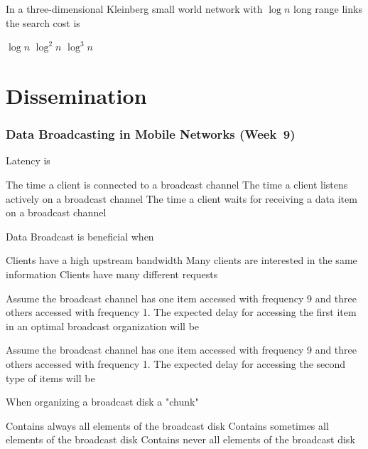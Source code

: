 \documentclass[12pt,a4paper,answers]{exam} %
\begin{document}
\begin{flushleft}
\begin{multicols*}{2}
\begin{questions}
\question In a three-dimensional Kleinberg small world network with $\log n$ long range links the search cost is
\begin{checkboxes}
\CorrectChoice $\log n$
\choice $\log^2 n$
\choice $\log^3 n$
\end{checkboxes}

\part{Dissemination}
\section{Data Broadcasting in Mobile Networks (Week~9)}

\question Latency is
\begin{checkboxes}
\choice The time a client is connected to a broadcast channel
\choice The time a client listens actively on a broadcast channel
\CorrectChoice The time a client waits for receiving a data item on a broadcast channel 
\end{checkboxes}

\question Data Broadcast is beneficial when
\begin{checkboxes}
\choice Clients have a high upstream bandwidth
\CorrectChoice Many clients are interested in the same information
\choice Clients have many different requests
\end{checkboxes}

\question Assume the broadcast channel has one item accessed with frequency 9 and three others accessed with frequency 1. The expected delay for accessing the first item in an optimal broadcast organization will be
\begin{checkboxes}
\end{checkboxes}

\question Assume the broadcast channel has one item accessed with frequency 9 and three others accessed with frequency 1. The expected delay for accessing the second type of items will be
\begin{checkboxes}
\end{checkboxes}

\question When organizing a broadcast disk a "chunk"
\begin{checkboxes}
\choice Contains always all elements of the broadcast disk
\CorrectChoice Contains sometimes all elements of the broadcast disk
\choice Contains never all elements of the broadcast disk
\end{checkboxes}


\end{questions}
\end{multicols*}
\end{flushleft}
\end{document}
